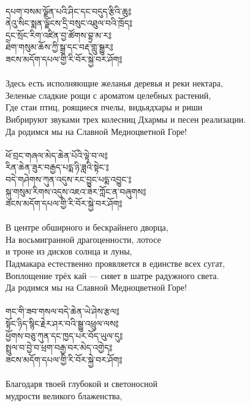 \\
{\ti དཔག་བསམ་ལྗོན་པའི་ཤིང་དང་བདུད་རྩིའི་ཆུ༔\\
ནེའུ་སིང་སྨན་ལྗོངས་དྲི་བསུང་འཐུལ་བའི་ཁྲོད༔\\
དྲང་སྲོང་རིག་འཛིན་བྱ་ཚོགས་བྷྲ་མ་ར༔\\
ཐེག་གསུམ་ཆོས་ཀྱི་སྒྲ་དང་བརྡ་གླུ་སྒྱུར༔\\
ཟངས་མདོག་དཔལ་གྱི་རི་བོར་སྐྱེ་བར་ཤོག༔}\\
\\
Здесь есть исполняющие желанья деревья и реки нектара,\\
Зеленые сладкие рощи с ароматом целебных растений,\\
Где стаи птиц, роящиеся пчелы, видьядхары и риши\\
Вибрируют звуками трех колесниц Дхармы и песен реализации.\\
Да родимся мы на Славной Медноцветной Горе!\\
\\
\newpage
{\ti ཕོ་བྲང་གཞལ་མེད་ཆེན་པོའི་ལྟེ་བ་ལ༔\\
རིན་ཆེན་ཟུར་བརྒྱད་པདྨ་ཉི་ཟླའི་སྟེང་༔\\
བདེ་གཤེགས་ཀུན་འདུས་རང་བྱུང་པདྨ་འབྱུང་༔\\
སྐུ་གསུམ་རིགས་འདུས་འཇའ་ཟེར་ཀློང་ན་བཞུགས༔\\
ཟངས་མདོག་དཔལ་གྱི་རི་བོར་སྐྱེ་བར་ཤོག༔}\\
\\
В центре обширного и бескрайнего дворца,\\
На восьмигранной драгоценности, лотосе \\ \indent и троне из дисков солнца и луны,\\
Падмакара естественно проявляется в единстве всех сугат,\\
Воплощение трёх кай — сияет в шатре радужного света.\\
Да родимся мы на Славной Медноцветной Горе!\\
\\
{\ti གང་གི་ཟབ་གསལ་བདེ་ཆེན་ཡེ་ཤེས་རྩལ༔\\
སྟོང་ཉིད་སྙིང་རྗེར་ཤར་བའི་སྒྱུ་འཕྲུལ་ལས༔\\
ཕྱོགས་བཅུ་ཀུན་དང་ཁྱད་པར་བོད་ཡུལ་དུ༔\\
སྤྲུལ་བ་བྱེ་བ་ཕྲག་བརྒྱ་བར་མེད་འགྱེད༔\\
ཟངས་མདོག་དཔལ་གྱི་རི་བོར་སྐྱེ་བར་ཤོག༔}\\
\\
\ru
Благодаря твоей глубокой и светоносной \\ \indent мудрости великого блаженства,\\
